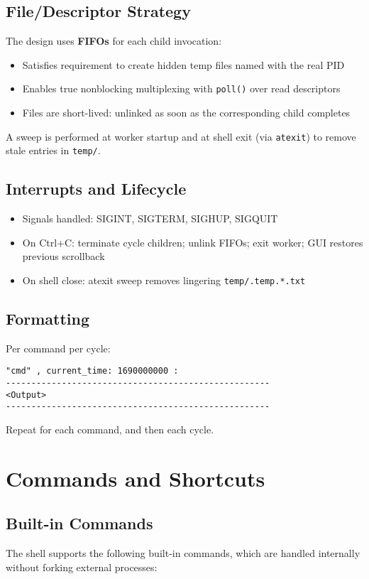 \documentclass[11pt,a4paper]{article}
\begin{document}
\subsection{File/Descriptor Strategy}
The design uses \textbf{FIFOs} for each child invocation:
\begin{itemize}[leftmargin=*]
  \item Satisfies requirement to create hidden temp files named with the real PID
  \item Enables true nonblocking multiplexing with \texttt{poll()} over read descriptors
  \item Files are short-lived: unlinked as soon as the corresponding child completes
\end{itemize}
A sweep is performed at worker startup and at shell exit (via \texttt{atexit}) to remove stale entries in \texttt{temp/}.

\subsection{Interrupts and Lifecycle}
\begin{itemize}[leftmargin=*]
  \item Signals handled: SIGINT, SIGTERM, SIGHUP, SIGQUIT
  \item On Ctrl+C: terminate cycle children; unlink FIFOs; exit worker; GUI restores previous scrollback
  \item On shell close: atexit sweep removes lingering \texttt{temp/.temp.*.txt}
\end{itemize}

\subsection{Formatting}
Per command per cycle:
\begin{lstlisting}[style=code]
"cmd" , current_time: 1690000000 :
----------------------------------------------------
<Output>
----------------------------------------------------
\end{lstlisting}
Repeat for each command, and then each cycle.

\section{Commands and Shortcuts}
\subsection{Built-in Commands}
The shell supports the following built-in commands, which are handled internally without forking external processes:
\end{document}
